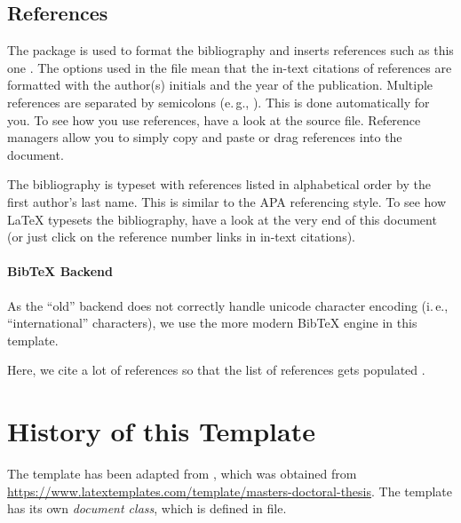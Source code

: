 \subsection{References}

The  package is used to format the bibliography and inserts references such as this one \parencite{murdoch_steven_j._chip_2010}. The options used in the  file mean that the in-text citations of references are formatted with the author(s) initials and the year \cite{anderson_ross_emv:_2014} of the publication. Multiple references are separated by semicolons (e.\,g., \cite{solat_security_2017, bond_chip_2014}). This is done automatically for you. To see how you use references, have a look at the  source file. Reference managers allow you to simply copy and paste or drag references into the document.

The bibliography is typeset with references listed in alphabetical order by the first author's last name. This is similar to the APA referencing style. To see how LaTeX typesets the bibliography, have a look at the very end of this document (or just click on the reference number links in in-text citations).

\paragraph{BibTeX Backend}

As the ``old''  backend does not correctly handle unicode character encoding (i.\,e., ``international'' characters), we use the more modern  BibTeX engine in this template.

Here, we cite a lot of references so that the list of references gets populated \cite{murdoch_steven_j._chip_2010,anderson_ross_emv:_2014,kou_weidong_secure_2003,solat_security_2017,bond_chip_2014,ortiz_s._is_2006,haselsteiner_security_2006,galloway_visa_2019,zhou_nshield_2014,lalehTaxonomyFraudsFraud2009,ferradiWhenOrganizedCrime2016,emvco_emvco_website,emvco_emvco_book1,emvco_emvco_book2,emvco_emvco_book3,emvco_emvco_book4,Yang10,Kopsell06,VilaGM03,Herrmann12-ipv6prefix,Herrmann14-diss,HBF:2013,Herrmann11-NordSec,AcarEEJND14,Herrmann09,WangG13,Raymond00,Hintz02,Herrmann14-encdns,FederrathFHP11,Goodson12-privacy,Fabian10,Google12,goldberg97,WendolskyHF07,chaum81,BertholdFK00,Dingledine04,rfc5246,LoesingMD10,FuchsHF13}.


\section{History of this Template}
The template has been adapted from , which was obtained from \url{https://www.latextemplates.com/template/masters-doctoral-thesis}. The template has its own \emph{document class}, which is defined in  file.

